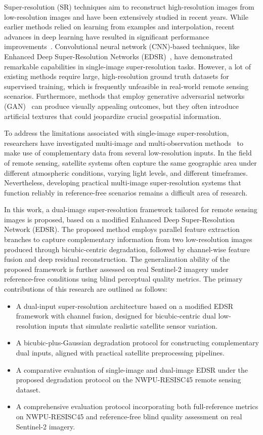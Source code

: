 \documentclass[conference]{IEEEtran}
\begin{document}
Super-resolution (SR) techniques aim to reconstruct high-resolution images from low-resolution images and have been extensively studied in recent years. While earlier methods relied on learning from examples and interpolation, recent advances in deep learning have resulted in significant performance improvements~\cite{dong2014srcnn,kim2016vdsr}. Convolutional neural network (CNN)-based techniques, like Enhanced Deep Super-Resolution Networks (EDSR)~\cite{lim2017edsr}, have demonstrated remarkable capabilities in single-image super-resolution tasks. However, a lot of existing methods require large, high-resolution ground truth datasets for supervised training, which is frequently unfeasible in real-world remote sensing scenarios. Furthermore, methods that employ generative adversarial networks (GAN)~\cite{ledig2017srgan,wang2018esrgan} can produce visually appealing outcomes, but they often introduce artificial textures that could jeopardize crucial geospatial information.

To address the limitations associated with single-image super-resolution, researchers have investigated multi-image and multi-observation methods~\cite{zhang2022trmisr,greza2024gan} to make use of complementary data from several low-resolution inputs. In the field of remote sensing, satellite systems often capture the same geographic area under different atmospheric conditions, varying light levels, and different timeframes. Nevertheless, developing practical multi-image super-resolution systems that function reliably in reference-free scenarios remains a difficult area of research.

In this work, a dual-image super-resolution framework tailored for remote sensing images is proposed, based on a modified Enhanced Deep Super-Resolution Network (EDSR). The proposed method employs parallel feature extraction branches to capture complementary information from two low-resolution images produced through bicubic-centric degradation, followed by channel-wise feature fusion and deep residual reconstruction. The generalization ability of the proposed framework is further assessed on real Sentinel-2 imagery under reference-free conditions using blind perceptual quality metrics. The primary contributions of this research are outlined as follows:

\begin{itemize}
\item A dual-input super-resolution architecture based on a modified EDSR framework with channel fusion, designed for bicubic-centric dual low-resolution inputs that simulate realistic satellite sensor variation.
\item A bicubic-plus-Gaussian degradation protocol for constructing complementary dual inputs, aligned with practical satellite preprocessing pipelines.
\item A comparative evaluation of single-image and dual-image EDSR under the proposed degradation protocol on the NWPU-RESISC45 remote sensing dataset.
\item A comprehensive evaluation protocol incorporating both full-reference metrics on NWPU-RESISC45 and reference-free blind quality assessment on real Sentinel-2 imagery.
\end{itemize}
\end{document}
